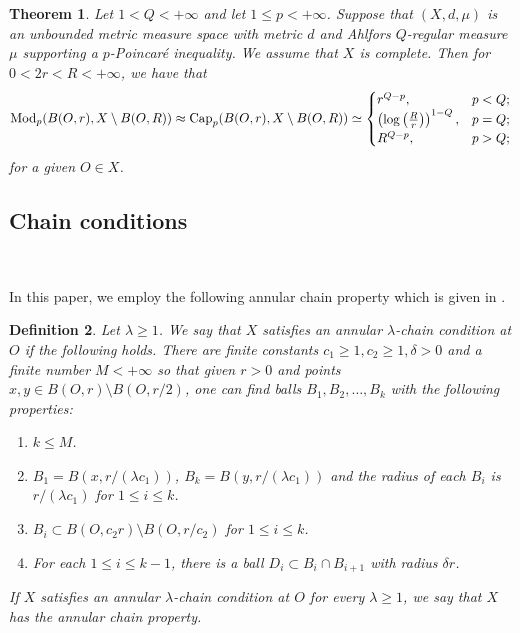 \documentclass[10pt]{amsart}
\newtheorem{theorem}{Theorem}[section]
\newtheorem{definition}[theorem]{Definition}
\numberwithin{equation}{section}
\begin{document}

\begin{theorem}\label{thm2.1-0506}
Let  $1<Q<+\infty$ and let $1\le p<+\infty$.
Suppose that $(X,d,\mu)$ is an unbounded metric measure space with metric $d$ and Ahlfors $Q$-regular measure $\mu$ supporting a $p$-Poincar\'e inequality.
We assume that $X$ is complete. 
Then for $0<2r<R<+\infty$, we have that
\[
	\text{\rm Mod}_p(B(O,r), X\setminus B(O,R)) \approx \text{\rm Cap}_p(B(O,r), X\setminus B(O,R))\simeq
 \begin{cases}
     r^{Q-p},&p<Q;\\
     \left(\log \left(\frac{R}{r}\right)\right)^{1-Q},& p=Q;\\
     R^{Q-p},& p>Q;
 \end{cases}  
\]
for a given $O\in X$.
\end{theorem}


\subsection{Chain conditions}
\label{sec-dyadic} \ 

In this paper, we employ the following  annular chain property which is given in \cite[Section 2.5]{KN22}.
\begin{definition} 
	\label{dyadic}
	Let $\lambda\geq1$. We say that $X$ satisfies an annular $\lambda$-chain condition at $O$  if the following holds. There are finite constants $c_1\geq 1, c_2\geq 1, \delta>0$ and a finite number $M<{+\infty}$  so that given $r>0$ and points $x,y\in B(O,r)\setminus B(O,r/2)$, one can find balls $B_1, B_2, \ldots, B_k$ with the following properties:
	\begin{enumerate}
		\item[1.] $k\leq M$.
		\item[2.] $B_1=B(x,r/(\lambda c_1))$, $B_k=B(y,r/(\lambda c_1))$ and the radius of  each $B_i$ is $r/(\lambda c_1)$ for $1\leq i\leq k$. 
		\item[3.] $ B_i\subset B(O,c_2r)\setminus B(O,r/c_2)$ for $1\leq i\leq k$.
		\item[4.] For each $1\leq i\leq k-1$, there is a ball $D_i\subset B_i\cap B_{i+1}$ with radius $\delta r$.
	\end{enumerate}
	If $X$ satisfies an annular $\lambda$-chain condition at $O$ for every $\lambda\geq 1$, we say that $X$ has the annular chain property.
\end{definition}
\end{document}
